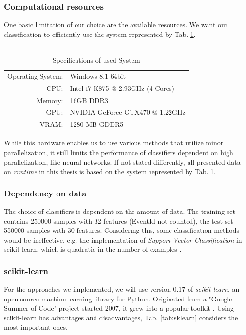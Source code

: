 \subsubsection{Computational resources}
One basic limitation of our choice are the available resources.
We want our classification to efficiently use the system represented by Tab. \ref{tab:specs}.

\begin{table}
  	\begin{tabular}{r l||}
		Operating System: & Windows 8.1 64bit\\
		CPU: & Intel i7 K875 @ 2.93GHz (4 Cores)\\
		Memory: & 16GB DDR3\\
		GPU: & NVIDIA GeForce GTX470 @ 1.22GHz\\
		VRAM: & 1280 MB GDDR5\\
	\end{tabular}
	\caption{\\Specifications of used System}
	\label{tab:specs}
\end{table}

While this hardware enables us to use various methods that utilize minor  parallelization, it still limits the performance of classifiers dependent on high parallelization, like neural networks. If not stated differently, all presented data on \emph{runtime} in this thesis is based on the system represented by Tab. \ref{tab:specs}.

\subsubsection{Dependency on data}
The choice of classifiers is dependent on the amount of data. The training set contains 250000 samples with 32 features (EventId not counted), the test set 550000 samples with 30 features. Considering this, some classification methods would be ineffective, e.g. the implementation of \emph{Support Vector Classification} in scikit-learn, which is quadratic in the number of examples \cite{sklearn}.

\subsubsection{scikit-learn}
For the approaches we implemented, we will use version 0.17 of \emph{scikit-learn}, an open source machine learning library for Python. Originated from a "Google Summer of Code" project started 2007, it grew into a popular toolkit \cite{sklearn}.
Using scikit-learn has advantages and disadvantages, Tab. \ref{tab:sklearn} considers the most important ones.

